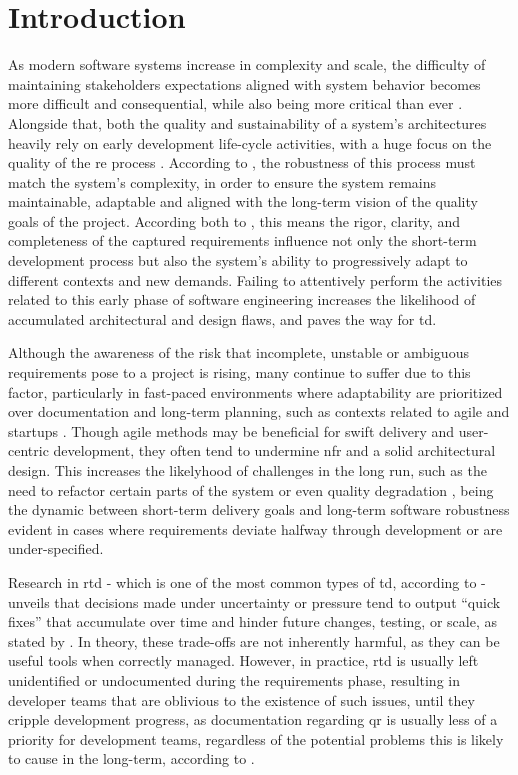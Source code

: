\documentclass[12pt,reqno, twoside]{amsbook}
\theoremstyle{plain}
\numberwithin{equation}{chapter}
\numberwithin{section}{chapter}
\begin{document}
\chapter{Introduction}
\noindent As modern software systems increase in complexity and scale, the difficulty of maintaining stakeholders expectations aligned with system behavior becomes more difficult and consequential, while also being more critical than ever \parencite{Venters2023}. Alongside that, both the quality and sustainability of a system's architectures heavily rely on early development life-cycle activities, with a huge focus on the quality of the \gls{re} process \parencite{Rios2019}. According to \textcite{Behutiye2022}, the robustness of this process must match the system's complexity, in order to ensure the system remains maintainable, adaptable and aligned with the long-term vision of the quality goals of the project. According both to \textcite{Behutiye2022,Melo2022}, this means the rigor, clarity, and completeness of the captured requirements influence not only the short-term development process but also the system's ability to progressively adapt to different contexts and new demands. Failing to attentively perform the activities related to this early phase of software engineering increases the likelihood of accumulated architectural and design flaws, and paves the way for \gls{td}.


Although the awareness of the risk that incomplete, unstable or ambiguous requirements pose to a project is rising, many continue to suffer due to this factor, particularly in fast-paced environments where adaptability are prioritized over documentation and long-term planning, such as contexts related to agile and startups \parencite{Behutiye2022}. Though agile methods may be beneficial for swift delivery and user-centric development, they often tend to undermine \gls{nfr} and a solid architectural design. This increases the likelyhood of challenges in the long run, such as the need to refactor certain parts of the system or even quality degradation \parencite{Snoeck2022}, being the dynamic between short-term delivery goals and long-term software robustness evident in cases where requirements deviate halfway through development or are under-specified.

Research in \gls{rtd} - which is one of the most common types of \gls{td}, according to \textcite{Wattanakriengkrai2018} - unveils that decisions made under uncertainty or pressure tend to output “quick fixes” that accumulate over time and hinder future changes, testing, or scale, as stated by \textcite{Melo2022}. In theory, these trade-offs are not inherently harmful, as they can be useful tools when correctly managed. However, in practice, \gls{rtd} is usually left unidentified or undocumented during the requirements phase, resulting in developer teams that are oblivious to the existence of such issues, until they cripple development progress, as documentation regarding \gls{qr} is usually less of a priority for development teams, regardless of the potential problems this is likely to cause in the long-term, according to  \textcite{Behutiye2022}.
\end{document}
